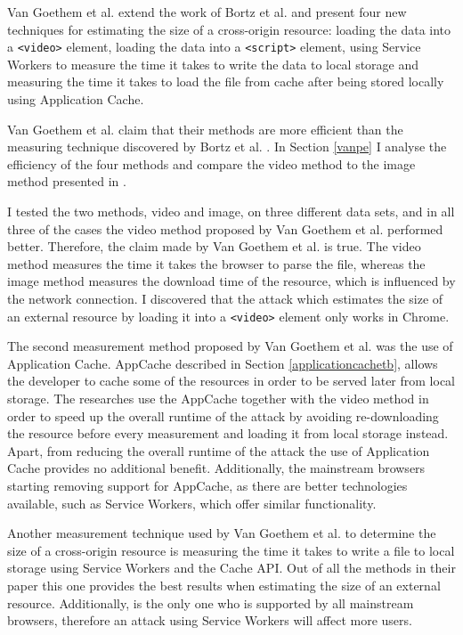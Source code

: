 \documentclass[10pt,a4paper,twoside]{book}
\begin{document}
Van Goethem et al. \cite{van2015clock} extend the work of Bortz et al. \cite{bortz2007exposing} and present four new techniques for estimating the size of a cross-origin resource: loading the data into a \texttt{<video>} element, loading the data into a \texttt{<script>} element, using Service Workers to measure the time it takes to write the data to local storage and measuring the time it takes to load the file from cache after being stored locally using Application Cache. 

Van Goethem et al. \cite{van2015clock} claim that their methods are more efficient than the measuring technique discovered by Bortz et al. \cite{bortz2007exposing}. In Section \ref{vanpe} I analyse the efficiency of the four methods and compare the video method to the image method presented in \cite{bortz2007exposing}.

I tested the two methods, video and image, on three different data sets, and in all three of the cases the video method proposed by Van Goethem et al. \cite{van2015clock} performed better. Therefore, the claim made by Van Goethem et al. \cite{van2015clock} is true. The video method measures the time it takes the browser to parse the file, whereas the image method measures the download time of the resource, which is influenced by the network connection. I discovered that the attack which estimates the size of an external resource by loading it into a \texttt{<video>} element only works in Chrome.

The second measurement method proposed by Van Goethem et al. \cite{van2015clock} was the use of Application Cache. AppCache described in Section \ref{applicationcachetb}, allows the developer to cache some of the resources in order to be served later from local storage. The researches use the AppCache together with the video method in order to speed up the overall runtime of the attack by avoiding re-downloading the resource before every measurement and loading it from local storage instead. Apart, from reducing the overall runtime of the attack the use of Application Cache provides no additional benefit. Additionally, the mainstream browsers starting removing support for AppCache, as there are better technologies available, such as Service Workers, which offer similar functionality.

Another measurement technique used by Van Goethem et al. \cite{van2015clock} to determine the size of a cross-origin resource is measuring the time it takes to write a file to local storage using Service Workers and the Cache API. Out of all the methods in their paper \cite{van2015clock} this one provides the best results when estimating the size of an external resource. Additionally, is the only one who is supported by all mainstream browsers, therefore an attack using Service Workers will affect more users.
\end{document}
